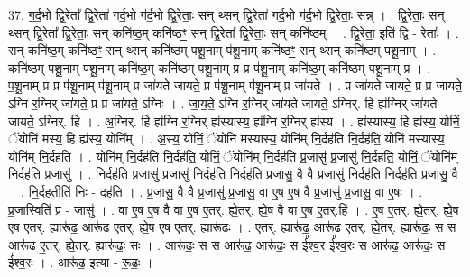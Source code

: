 \documentclass[17pt]{extarticle}
\begin{document}
37. ग॒र्द॒भो द्वि॒रेता᳚ द्वि॒रेता॑ गर्द॒भो ग॑र्द॒भो द्वि॒रेताः॒ सन् थ्सन् द्वि॒रेता॑ गर्द॒भो ग॑र्द॒भो द्वि॒रेताः॒ सन्न् । . द्वि॒रेताः॒ सन् थ्सन् द्वि॒रेता᳚ द्वि॒रेताः॒ सन् कनि॑ष्ठ॒म् कनि॑ष्ठꣳ॒॒ सन् द्वि॒रेता᳚ द्वि॒रेताः॒ सन् कनि॑ष्ठम् । . द्वि॒रेता॒ इति॑ द्वि - रेताः᳚ । . सन् कनि॑ष्ठ॒म् कनि॑ष्ठꣳ॒॒ सन् थ्सन् कनि॑ष्ठम् पशू॒नाम् प॑शू॒नाम् कनि॑ष्ठꣳ॒॒ सन् थ्सन् कनि॑ष्ठम् पशू॒नाम् । . कनि॑ष्ठम् पशू॒नाम् प॑शू॒नाम् कनि॑ष्ठ॒म् कनि॑ष्ठम् पशू॒नाम् प्र प्र प॑शू॒नाम् कनि॑ष्ठ॒म् कनि॑ष्ठम् पशू॒नाम् प्र । . प॒शू॒नाम् प्र प्र प॑शू॒नाम् प॑शू॒नाम् प्र जा॑यते जायते॒ प्र प॑शू॒नाम् प॑शू॒नाम् प्र जा॑यते । . प्र जा॑यते जायते॒ प्र प्र जा॑यते॒ ऽग्नि र॒ग्निर् जा॑यते॒ प्र प्र जा॑यते॒ ऽग्निः । . जा॒य॒ते॒ ऽग्नि र॒ग्निर् जा॑यते जायते॒ ऽग्निर्. हि ह्य॑ग्निर् जा॑यते जायते॒ ऽग्निर्. हि । . अ॒ग्निर्. हि ह्य॑ग्नि र॒ग्निर् ह्य॑स्यास्य॒ ह्य॑ग्नि र॒ग्निर् ह्य॑स्य । . ह्य॑स्यास्य॒ हि ह्य॑स्य॒ योनिं॒ ॅयोनि॑ मस्य॒ हि ह्य॑स्य॒ योनि᳚म् । . अ॒स्य॒ योनिं॒ ॅयोनि॑ मस्यास्य॒ योनि॑म् नि॒र्दह॑ति नि॒र्दह॑ति॒ योनि॑ मस्यास्य॒ योनि॑म् नि॒र्दह॑ति । . योनि॑म् नि॒र्दह॑ति नि॒र्दह॑ति॒ योनिं॒ ॅयोनि॑म् नि॒र्दह॑ति प्र॒जासु॑ प्र॒जासु॑ नि॒र्दह॑ति॒ योनिं॒ ॅयोनि॑म् नि॒र्दह॑ति प्र॒जासु॑ । . नि॒र्दह॑ति प्र॒जासु॑ प्र॒जासु॑ नि॒र्दह॑ति नि॒र्दह॑ति प्र॒जासु॒ वै वै प्र॒जासु॑ नि॒र्दह॑ति नि॒र्दह॑ति प्र॒जासु॒ वै । . नि॒र्दह॒तीति॑ निः - दह॑ति । . प्र॒जासु॒ वै वै प्र॒जासु॑ प्र॒जासु॒ वा ए॒ष ए॒ष वै प्र॒जासु॑ प्र॒जासु॒ वा ए॒षः । . प्र॒जास्विति॑ प्र - जासु॑ । . वा ए॒ष ए॒ष वै वा ए॒ष ए॒तर्. ह्ये॒तर्. ह्ये॒ष वै वा ए॒ष ए॒तर्.हि॑ । . ए॒ष ए॒तर्. ह्ये॒तर्. ह्ये॒ष ए॒ष ए॒तर्. ह्यारू॑ढ॒ आरू॑ढ ए॒तर्. ह्ये॒ष ए॒ष ए॒तर्. ह्यारू॑ढः । . ए॒तर्. ह्यारू॑ढ॒ आरू॑ढ ए॒तर्. ह्ये॒तर्. ह्यारू॑ढः॒ स स आरू॑ढ ए॒तर्. ह्ये॒तर्. ह्यारू॑ढः॒ सः । . आरू॑ढः॒ स स आरू॑ढ॒ आरू॑ढः॒ स ई᳚श्व॒र ई᳚श्व॒रः स आरू॑ढ॒ आरू॑ढः॒ स ई᳚श्व॒रः । . आरू॑ढ॒ इत्या - रू॒ढः॒ । \newline
\pagebreak
{}
\end{document}
